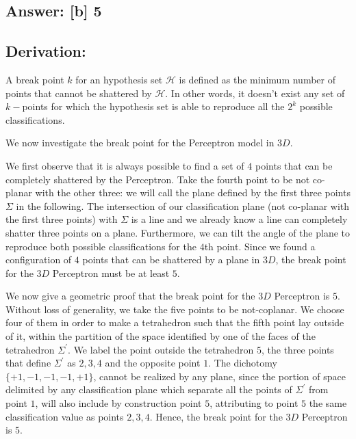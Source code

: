 \documentclass[11pt]{article}
\begin{document}
\hypertarget{answer-b-5}{%
\subsection{Answer: {[}b{]} 5}\label{answer-b-5}}

\hypertarget{derivation}{%
\subsection{Derivation:}\label{derivation}}

A break point \(k\) for an hypothesis set \(\mathcal{H}\) is defined as
the minimum number of points that cannot be shattered by
\(\mathcal{H}\). In other words, it doesn't exist any set of
\(k-\)points for which the hypothesis set is able to reproduce all the
\(2^k\) possible classifications.

We now investigate the break point for the Perceptron model in \(3D\).

We first observe that it is always possible to find a set of \(4\)
points that can be completely shattered by the Perceptron. Take the
fourth point to be not co-planar with the other three: we will call the
plane defined by the first three points \(\Sigma\) in the following. The
intersection of our classification plane (not co-planar with the first
three points) with \(\Sigma\) is a line and we already know a line can
completely shatter three points on a plane. Furthermore, we can tilt the
angle of the plane to reproduce both possible classifications for the
\(4\)th point. Since we found a configuration of \(4\) points that can
be shattered by a plane in \(3D\), the break point for the \(3D\)
Perceptron must be at least \(5\).

We now give a geometric proof that the break point for the \(3D\)
Perceptron is \(5\). Without loss of generality, we take the five points
to be not-coplanar. We choose four of them in order to make a
tetrahedron such that the fifth point lay outside of it, within the
partition of the space identified by one of the faces of the tetrahedron
\(\Sigma^\prime\). We label the point outside the tetrahedron \(5\), the
three points that define \(\Sigma^\prime\) as \(2,3,4\) and the opposite
point \(1\). The dichotomy \(\{+1,-1,-1,-1,+1\}\), cannot be realized by
any plane, since the portion of space delimited by any classification
plane which separate all the points of \(\Sigma^\prime\) from point
\(1\), will also include by construction point \(5\), attributing to
point \(5\) the same classification value as points \(2,3,4\). Hence,
the break point for the \(3D\) Perceptron is \(5\).
\end{document}
